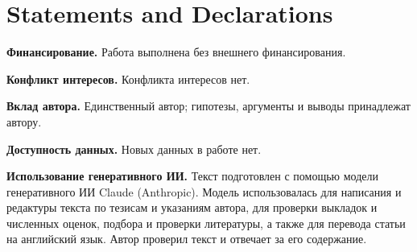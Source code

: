 \documentclass[11pt,a4paper]{article}
\begin{document}
\section*{Statements and Declarations}

\noindent\textbf{Финансирование.} Работа выполнена без внешнего финансирования.

\noindent\textbf{Конфликт интересов.} Конфликта интересов нет.

\noindent\textbf{Вклад автора.} Единственный автор; гипотезы, аргументы и выводы принадлежат автору.

\noindent\textbf{Доступность данных.} Новых данных в работе нет.

\noindent\textbf{Использование генеративного ИИ.} Текст подготовлен с помощью модели генеративного ИИ Claude (Anthropic). Модель использовалась для написания и редактуры текста по тезисам и указаниям автора, для проверки выкладок и численных оценок, подбора и проверки литературы, а также для перевода статьи на английский язык. Автор проверил текст и отвечает за его содержание.



\end{document}
